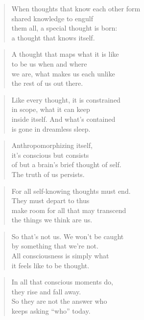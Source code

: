 \documentclass[10pt,a4paper]{article}
\begin{document}
\begin{multicols}{2}
\begin{verse}
When thoughts that know each other form\\
shared knowledge to engulf\\
them all, a special thought is born:\\
a thought that knows itself.
\end{verse}

\begin{verse}
A thought that maps what it is like\\
to be us when and where\\
we are, what makes us each unlike\\
the rest of us out there.
\end{verse}

\begin{verse}
Like every thought, it is constrained\\
in scope, what it can keep\\
inside itself. And what’s contained\\
is gone in dreamless sleep.
\end{verse}

\begin{verse}
Anthropomorphizing itself,\\
it’s conscious but consists\\
of but a brain’s brief thought of self.\\
The truth of us persists.
\end{verse}

\begin{verse}
For all self-knowing thoughts must end.\\
They must depart to thus\\
make room for all that may transcend\\
the things we think are us.
\end{verse}

\begin{verse}
So that’s not us. We won’t be caught\\
by something that we’re not.\\
All consciousness is simply what\\
it feels like to be thought.
\end{verse}

\begin{verse}
In all that conscious moments do,\\
they rise and fall away.\\
So they are not the answer who\\
keeps asking “who” today.
\end{verse}


\end{multicols}
\end{document}

